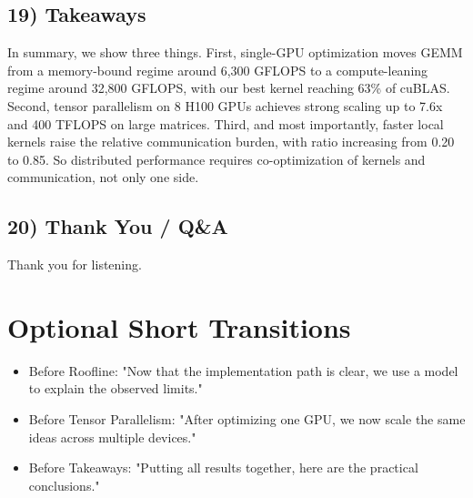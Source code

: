 \documentclass[11pt]{article}
\begin{document}
\subsection*{19) Takeaways}
In summary, we show three things. First, single-GPU optimization moves GEMM from a memory-bound regime around 6,300 GFLOPS to a compute-leaning regime around 32,800 GFLOPS, with our best kernel reaching 63\% of cuBLAS. Second, tensor parallelism on 8 H100 GPUs achieves strong scaling up to 7.6x and 400 TFLOPS on large matrices. Third, and most importantly, faster local kernels raise the relative communication burden, with ratio increasing from 0.20 to 0.85. So distributed performance requires co-optimization of kernels and communication, not only one side.

\subsection*{20) Thank You / Q\&A}
Thank you for listening.

\section*{Optional Short Transitions}
\begin{itemize}[leftmargin=1.5em]
  \item Before Roofline: "Now that the implementation path is clear, we use a model to explain the observed limits."
  \item Before Tensor Parallelism: "After optimizing one GPU, we now scale the same ideas across multiple devices."
  \item Before Takeaways: "Putting all results together, here are the practical conclusions."
\end{itemize}
\end{document}
